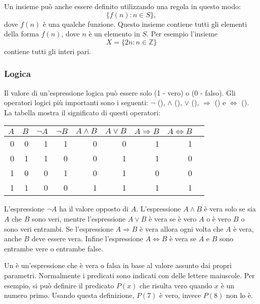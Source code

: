 Un insieme può anche essere definito utilizzando una regola in questo modo: 
\[\{f(n) : n \in S\},\]
dove $f(n)$ è una qualche funzione.
Questo insieme contiene tutti gli elementi della forma $f(n)$,
dove $n$ è un elemento in $S$.
Per esempio l'insieme
\[X=\{2n : n \in \mathbb{Z}\}\]
contiene tutti gli interi pari.

\subsubsection{Logica}


Il valore di un'espressione logica può essere solo
 (1 - vero) o  (0 - falso).
Gli operatori logici più importanti sono i seguenti: 
$\lnot$ (), 
$\land$ (), 
$\lor$ (), 
$\Rightarrow$ () e
$\Leftrightarrow$ ().
La tabella mostra il significato di questi operatori:

\begin{center}
\begin{tabular}{rr|rrrrrrr}
$A$ & $B$ & $\lnot A$ & $\lnot B$ & $A \land B$ & $A \lor B$ & $A \Rightarrow B$ & $A \Leftrightarrow B$ \\
\hline
0 & 0 & 1 & 1 & 0 & 0 & 1 & 1 \\
0 & 1 & 1 & 0 & 0 & 1 & 1 & 0 \\
1 & 0 & 0 & 1 & 0 & 1 & 0 & 0 \\
1 & 1 & 0 & 0 & 1 & 1 & 1 & 1 \\
\end{tabular}
\end{center}

L'espressione $\lnot A$ ha il valore opposto di $A$.
L'espressione $A \land B$ è vera solo se sia $A$ che $B$ sono veri,
mentre l'espressione $A \lor B$ è vera se è vero $A$ o è vero $B$ o sono veri entrambi.
Se l'espressione $A \Rightarrow B$ è vera
allora ogni volta che $A$ è vera, anche $B$ deve essere vera.
Infine l'espressione $A \Leftrightarrow B$ è vera
se $A$ e $B$ sono entrambe vere o entrambe false.


Un  è un'espressione che è vera o falsa in base
al valore assunto dai propri parametri.
Normalmente i predicati sono indicati con delle lettere maiuscole.
Per esempio, si può definire il predicato $P(x)$
che risulta vero quando $x$ è un numero primo.
Usando questa definizione, $P(7)$ è vero, invece $P(8)$ non lo è.


